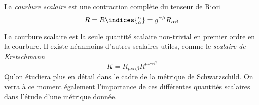 \begin{theoremframe}
    \begin{defi}
        La \emph{courbure scalaire} est une contraction complète du tenseur de Ricci 
        \begin{equation}
            R = R\indices{^{\alpha}_{\alpha}} = g^{\alpha \beta }R_{\alpha \beta}
        \end{equation}
    \end{defi}
\end{theoremframe}
La courbure scalaire est la seule quantité scalaire non-trivial en premier ordre en la courbure. Il existe néanmoins d'autres scalaires utiles, comme le \emph{scalaire de Kretschmann}
\begin{equation}
    K = R_{\mu\nu \alpha\beta} R^{\mu\nu\alpha\beta}
\end{equation}
Qu'on étudiera plus en détail dans le cadre de la métrique de Schwarzschild. On verra à ce moment également l'importance de ces différentes quantités scalaires dans l'étude d'une métrique donnée.

